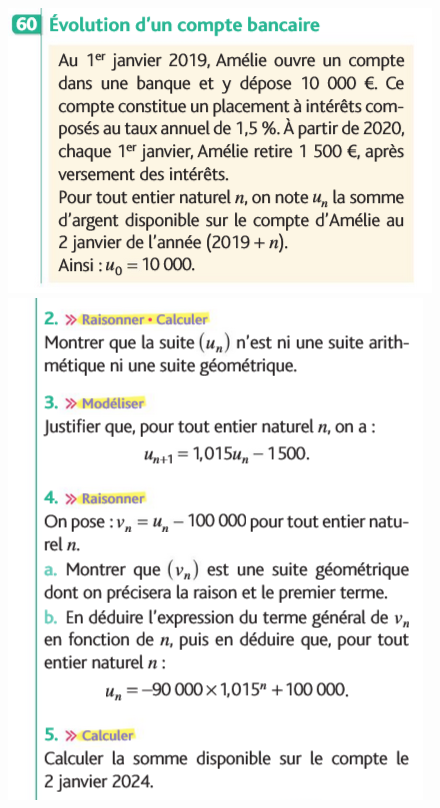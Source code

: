 \documentclass{article}
\begin{document}
\begin{center}
\begin{minipage}{0.45\textwidth}
\end{minipage}
\hfill\vline\hfill
\begin{minipage}{0.45\textwidth}
\includegraphics[width=\textwidth]{Exercice_2a.png}    
\includegraphics[width=\textwidth]{Exercice_2b.png}    
\end{minipage}    
    
\end{center}
\end{document}
